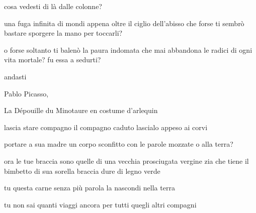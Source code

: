 \begin{poem}
	\begin{stanza}
		cosa vedesti di là dalle colonne?
	\end{stanza}

	\begin{stanza}
		una fuga infinita di mondi\verseline
		appena oltre il ciglio dell'abisso\verseline
		che forse ti sembrò bastare\verseline
		sporgere la mano per toccarli?
	\end{stanza}

	\begin{stanza}
		o forse soltanto ti balenò la paura\verseline
		indomata\verseline
		che mai abbandona le radici di ogni vita mortale?\verseline
		fu essa a sedurti?
	\end{stanza}

	\begin{stanza}
		andasti
	\end{stanza}
\end{poem}

\clearpage


\begin{artItem}
	Pablo Picasso, \begin{otherlanguage}{french}%
		La Dépouille du Minotaure en costume d’arlequin%
	\end{otherlanguage}
\end{artItem}

\begin{poem}
	\begin{stanza}
		lascia stare compagno\verseline
		il compagno caduto\verseline
		lascialo appeso\verseline
		ai corvi
	\end{stanza}

	\begin{stanza}
		portare a sua madre\verseline
		un corpo sconfitto\verseline
		con le parole mozzate\verseline
		o alla terra?
	\end{stanza}

	\begin{stanza}
		ora le tue braccia sono quelle\verseline
		di una vecchia prosciugata vergine zia\verseline
		che tiene il bimbetto di sua sorella\verseline
		braccia dure di legno verde
	\end{stanza}

	\begin{stanza}
		tu questa carne\verseline
		senza più parola\verseline
		la nascondi\verseline
		nella terra
	\end{stanza}

	\begin{stanza}
		tu non sai quanti viaggi\verseline
		ancora\verseline
		per tutti quegli altri\verseline
		compagni
	\end{stanza}
\end{poem}

